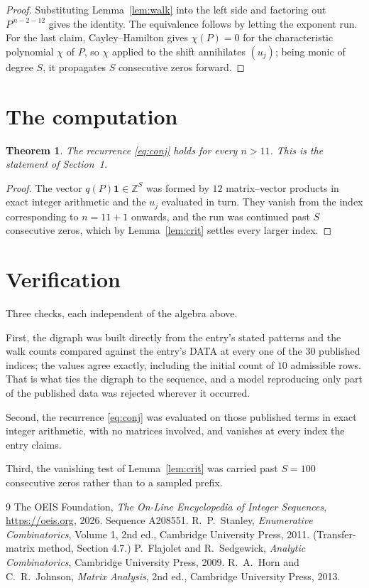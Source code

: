 \documentclass[11pt,a4paper]{article}
\theoremstyle{plain}
\newtheorem{theorem}{Theorem}
\theoremstyle{definition}
\begin{document}
\begin{proof}
Substituting Lemma~\ref{lem:walk} into the left side and factoring out
$P^{\,n-2-12}$ gives the identity. The equivalence follows by letting the exponent
run. For the last claim, Cayley--Hamilton gives $\chi(P)=0$ for the characteristic
polynomial $\chi$ of $P$, so $\chi$ applied to the shift annihilates $(u_j)$; being monic of
degree $S$, it propagates $S$ consecutive zeros forward.
\end{proof}

\section{The computation}

\begin{theorem}
The recurrence \eqref{eq:conj} holds for every $n>11$. This is the statement of
Section~1.
\end{theorem}

\begin{proof}
The vector $q(P)\mathbf{1}\in\mathbb{Z}^{S}$ was formed by $12$ matrix--vector
products in exact integer arithmetic and the $u_j$ evaluated in turn. They vanish from the
index corresponding to $n=11+1$ onwards, and the run was continued past $S$ consecutive
zeros, which by Lemma~\ref{lem:crit} settles every larger index.
\end{proof}

\section{Verification}

Three checks, each independent of the algebra above.

First, the digraph was built directly from the entry's stated patterns and the walk counts
compared against the entry's DATA at every one of the $30$ published indices; the
values agree exactly, including the initial count of $10$ admissible rows. That is
what ties the digraph to the sequence, and a model reproducing only part of the published
data was rejected wherever it occurred.

Second, the recurrence \eqref{eq:conj} was evaluated on those published terms in exact
integer arithmetic, with no matrices involved, and vanishes at every index the entry claims.

Third, the vanishing test of Lemma~\ref{lem:crit} was carried past $S=100$ consecutive
zeros rather than to a sampled prefix.

\begin{thebibliography}{9}
 The OEIS Foundation, \emph{The On-Line Encyclopedia of Integer
Sequences}, \url{https://oeis.org}, 2026. Sequence A208551.
 R.~P.~Stanley, \emph{Enumerative Combinatorics}, Volume 1, 2nd ed.,
Cambridge University Press, 2011. (Transfer-matrix method, Section 4.7.)
 P.~Flajolet and R.~Sedgewick, \emph{Analytic Combinatorics}, Cambridge
University Press, 2009.
 R.~A.~Horn and C.~R.~Johnson, \emph{Matrix Analysis}, 2nd ed., Cambridge
University Press, 2013.
\end{thebibliography}
\end{document}
